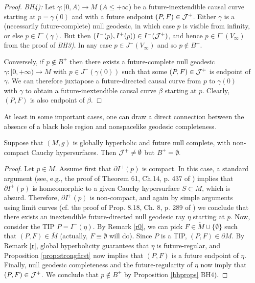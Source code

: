 \begin{proof}
\smallskip

\textit{BH4):} Let $\gamma:[0,A) \rightarrow M$ ($A \leq +\infty$) be a future-inextendible causal curve starting at $p =\gamma(0)$ and with a future endpoint $(P,F) \in {\cal J}^+$. Either $\gamma$ is a (necessarily future-complete) null geodesic, in which case $p$ is visible from infinity, or else $p \in I^-(\gamma)$. But then $(I^-(p),I^+(p)) \in I^-({\cal J}^+)$, and hence $p \in I^-(V_{\infty})$ from the proof of \textit{BH3)}. In any case $p \in J^-(V_{\infty})$ and so $p \notin B^+$.

Conversely, if $p \notin B^+$ then there exists a future-complete null geodesic $\gamma:[0,+\infty) \rightarrow M$ with $p \in J^-(\gamma(0))$
such that some $(P,F)\in {\cal J}^+$ is endpoint of $\gamma$. We can therefore juxtapose a future-directed causal curve from $p$ to $\gamma(0)$ with $\gamma$ to obtain a future-inextendible causal curve $\beta$ starting at $p$. Clearly, $(P,F)$ is also endpoint of $\beta$.
\end{proof}

At least in some important cases, one can draw a direct connection between the absence of a black hole region and nonspacelike geodesic completeness.

\begin{proposition}
\label{completeness1}
Suppose that $(M,g)$ is globally hyperbolic and future null complete, with non-compact Cauchy hypersurfaces. Then ${\cal J}^+ \neq \emptyset$ but $B^+ = \emptyset$.
\end{proposition}
\begin{proof}
Let $p \in M$. Assume first that $\partial I^+(p)$ is compact. In this case, a standard argument (see, e.g., the proof of Theorem 61, Ch.14, p. 437 of \cite{ONeillSemiRiemannianGeometryApplications1983}) implies that $\partial I^+(p)$ is homeomorphic to a given Cauchy hypersurface $S\subset M$, which is absurd. Therefore, $\partial I^+(p)$ is non-compact, and again by simple arguments using limit curves (cf. the proof of Prop. 8.18, Ch. 8, p. 289 of \cite{BeemGlobalLorentzianGeometry1996}) we conclude that there exists an inextendible future-directed null geodesic ray $\eta$ starting at $p$. Now, consider the TIP $P=I^{-}(\eta)$. By Remark \ref{r0}, we can pick $F \in \check{M}\cup\{\emptyset\}$ such that $(P,F) \in \overline{M}$ (actually, $F\equiv \emptyset$ will do). Since $P$ is a TIP, $(P,F) \in \partial M$. By Remark \ref{r}, global hyperbolicity guarantees that $\eta$ is future-regular, and Proposition \ref{prop:strongfirst} now implies that $(P,F)$ is a future endpoint of $\eta$. Finally, null geodesic completeness and the future-regularity of $\eta$ now imply that $(P,F) \in {\cal J}^+$. We conclude that $p \notin B^+$ by Proposition \ref{bhprops} BH4).
\end{proof}

